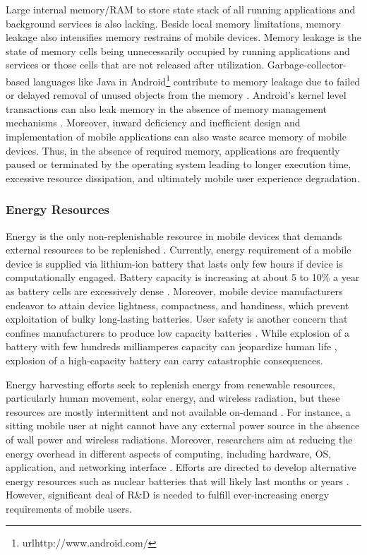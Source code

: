 \documentclass[publish]{IEEEtran}
\begin{document}
Large internal memory/RAM to store state stack of all running applications and background services is also lacking. Beside local memory limitations, memory leakage also intensifies memory restrains of mobile devices. Memory leakage is the state of memory cells being unnecessarily occupied by running applications and services or those cells that are not released after utilization. Garbage-collector-based languages like Java in Android\footnote{url{http://www.android.com/}} contribute to memory leakage due to failed or delayed removal of unused objects from the memory \cite{Park2012}. Android's kernel level transactions can also leak memory in the absence of memory management mechanisms \cite{Xu2008,Park2012}. Moreover, inward deficiency and inefficient design and implementation of mobile applications can also waste scarce memory of mobile devices. Thus, in the absence of required memory, applications are frequently paused or terminated by the operating system leading to longer execution time, excessive resource dissipation, and ultimately mobile user experience degradation.

\subsubsection{Energy Resources}
Energy is the only non-replenishable resource in mobile devices that demands external resources to be replenished \cite{Satyanarayanan2005, Miettinen2010}. Currently, energy requirement of a mobile device is supplied via lithium-ion battery that lasts only few hours if device is computationally engaged. Battery capacity is increasing at about 5 to 10\% a year \cite{Neuvo2004, Robinson2009} as battery cells are excessively dense \cite{Satyanarayanan2005}. Moreover, mobile device manufacturers endeavor to attain device lightness, compactness, and handiness, which prevent exploitation of bulky long-lasting batteries. User safety is another concern that confines manufacturers to produce low capacity batteries \cite{mobileexplosion}. While explosion of a battery with few hundreds milliamperes capacity can jeopardize human life \cite{cellularnews}, explosion of a high-capacity battery can carry catastrophic consequences. 

Energy harvesting efforts \cite{Flinna, Starner, R.Avro2009} seek to replenish energy from renewable resources, particularly human movement, solar energy, and wireless radiation, but these resources are mostly intermittent and not available on-demand \cite{Pickard2012}. For instance, a sitting mobile user at night cannot have any external power source in the absence of wall power and wireless radiations. Moreover, researchers aim at reducing the energy overhead in different aspects of computing, including hardware, OS, application, and networking interface \cite{Bianzino2012,Vallina-Rodriguez2013}. Efforts are directed to develop alternative energy resources such as nuclear batteries that will likely last months or years \cite{KelseyJackson2009}. However, significant deal of R\&D is needed to fulfill ever-increasing energy requirements of mobile users.
\end{document}
